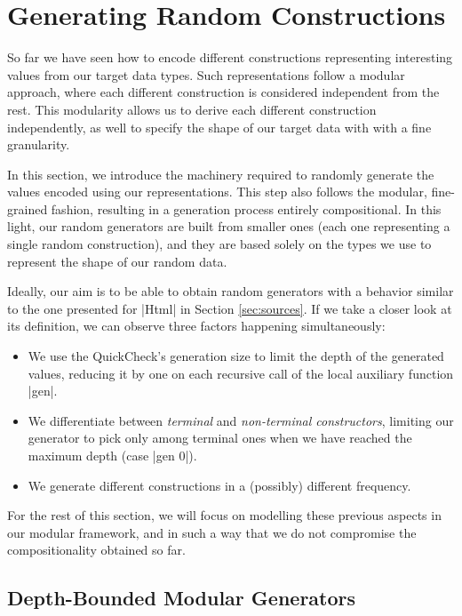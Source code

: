 \section{Generating Random Constructions}
\label{sec:generators}

%
So far we have seen how to encode different constructions representing
interesting values from our target data types.
%
Such representations follow a modular approach, where each different
construction is considered independent from the rest.
%
This modularity allows us to derive each different construction independently,
as well to specify the shape of our target data with with a fine granularity.


In this section, we introduce the machinery required to randomly generate the
values encoded using our representations.
%
This step also follows the modular, fine-grained fashion, resulting in a
generation process entirely compositional.
%
In this light, our random generators are built from smaller ones (each one
representing a single random construction), and they are based solely on the
types we use to represent the shape of our random data.

Ideally, our aim is to be able to obtain random generators with a behavior
similar to the one presented for |Html| in Section \ref{sec:sources}.
%
If we take a closer look at its definition, we can observe three factors
happening simultaneously:
%
\begin{itemize}
\item We use the QuickCheck's generation size to limit the depth of the
  generated values, reducing it by one on each recursive call of the local
  auxiliary function |gen|.
\item We differentiate between \emph{terminal} and \emph{non-terminal
    constructors}, limiting our generator to pick only among terminal ones when
  we have reached the maximum depth (case |gen 0|).
\item We generate different constructions in a (possibly) different frequency.
\end{itemize}
%
For the rest of this section, we will focus on modelling these previous aspects
in our modular framework, and in such a way that we do not compromise the
compositionality obtained so far.


%
\subsection{Depth-Bounded Modular Generators}

